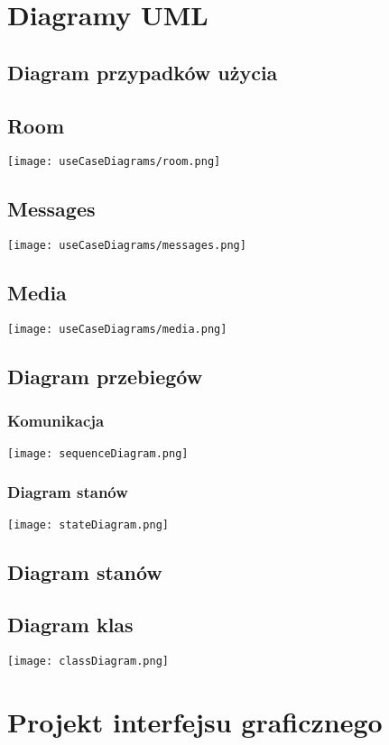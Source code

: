 \documentclass{article}
\begin{document}
\section{Diagramy UML}

\subsection{Diagram przypadków użycia}

\subsection{Room}
\texttt{[image: useCaseDiagrams/room.png]}

\subsection{Messages}
\texttt{[image: useCaseDiagrams/messages.png]}

\subsection{Media}
\texttt{[image: useCaseDiagrams/media.png]}

\subsection{Diagram przebiegów}
\subsubsection{Komunikacja}
\texttt{[image: sequenceDiagram.png]}

\subsubsection{Diagram stanów}
\texttt{[image: stateDiagram.png]}

\subsection{Diagram stanów}

\subsection{Diagram klas}
\texttt{[image: classDiagram.png]}

\section{Projekt interfejsu graficznego}
\end{document}
